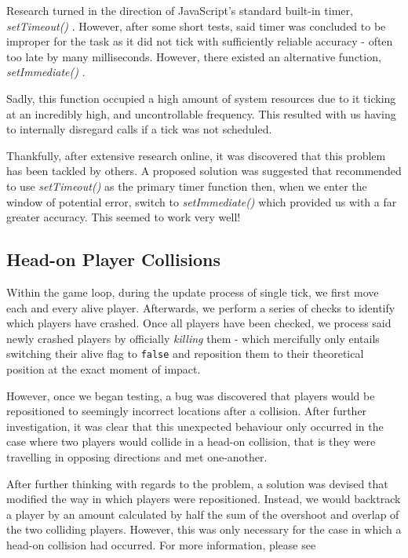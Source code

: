 \documentclass{standalone}
\begin{document}
			Research turned in the direction of JavaScript's standard built-in timer, \emph{setTimeout()} \parencite{JsSetTimeout}. However, after some short tests, said timer was concluded to be improper for the task as it did not tick with sufficiently reliable accuracy - often too late by many milliseconds. However, there existed an alternative function, \emph{setImmediate()} \parencite{JsSetImmediate}. 

			Sadly, this function occupied a high amount of system resources due to it ticking at an incredibly high, and uncontrollable frequency. This resulted with us having to internally disregard calls if a tick was not scheduled.

			Thankfully, after extensive research online, it was discovered that this problem has been tackled by others. A proposed solution\parencite{JsGameLoop} was suggested that recommended to use \emph{setTimeout()} as the primary timer function then, when we enter the window of potential error, switch to \emph{setImmediate()} which provided us with a far greater accuracy. This seemed to work very well!

		\subsection{Head-on Player Collisions}
			Within the game loop, during the update process of single tick, we first move each and every alive player. Afterwards, we perform a series of checks to identify which players have crashed. Once all players have been checked, we process said newly crashed players by officially \emph{killing} them - which mercifully only entails switching their alive flag to \texttt{false} and reposition them to their theoretical position at the exact moment of impact.

			However, once we began testing, a bug was discovered that players would be repositioned to seemingly incorrect locations after a collision. After further investigation, it was clear that this unexpected behaviour only occurred in the case where two players would collide in a head-on collision, that is they were travelling in opposing directions and met one-another.

			After further thinking with regards to the problem, a solution was devised that modified the way in which players were repositioned. Instead, we would backtrack a player by an amount calculated by half the sum of the overshoot and overlap of the two colliding players. However, this was only necessary for the case in which a head-on collision had occurred. For more information, please see 
\end{document}
